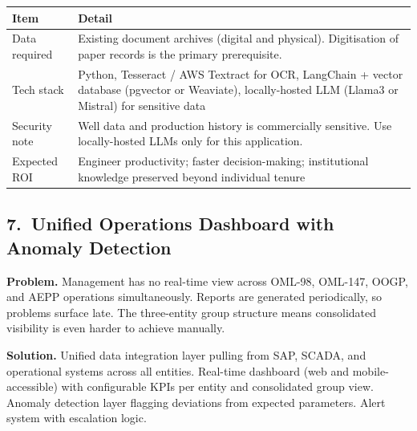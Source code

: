 \documentclass[10pt]{article}
\begin{document}
\vspace{4pt}
\small
\begin{tabularx}{\columnwidth}{@{}lX@{}}
\toprule
\textbf{Item} & \textbf{Detail} \\
\midrule
Data required     & Existing document archives (digital and physical). Digitisation
                    of paper records is the primary prerequisite. \\
Tech stack        & Python, Tesseract / AWS Textract for OCR, LangChain + vector
                    database (pgvector or Weaviate), locally-hosted LLM (Llama3 or
                    Mistral) for sensitive data \\
Security note     & Well data and production history is commercially sensitive.
                    Use locally-hosted LLMs only for this application. \\
Expected ROI      & Engineer productivity; faster decision-making; institutional
                    knowledge preserved beyond individual tenure \\
\bottomrule
\end{tabularx}
\normalsize

\vspace{8pt}

\subsection*{7.\ Unified Operations Dashboard with Anomaly Detection}

{\small
\textbf{Problem.}
Management has no real-time view across OML-98, OML-147, OOGP, and AEPP operations
simultaneously. Reports are generated periodically, so problems surface late. The
three-entity group structure means consolidated visibility is even harder to achieve
manually.

\vspace{4pt}
\textbf{Solution.}
Unified data integration layer pulling from SAP, SCADA, and operational systems across
all entities. Real-time dashboard (web and mobile-accessible) with configurable KPIs
per entity and consolidated group view. Anomaly detection layer flagging deviations
from expected parameters. Alert system with escalation logic.
}
\end{document}
